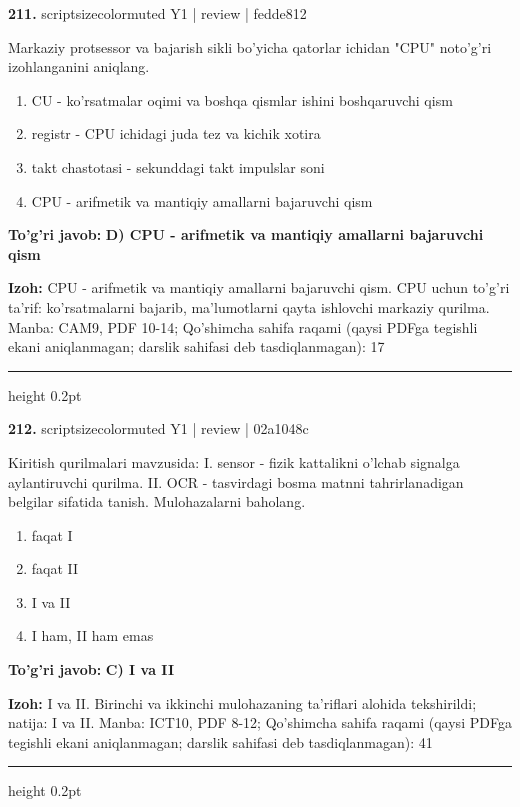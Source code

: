 \documentclass[10pt,a4paper]{article}
\begin{document}
{\bfseries\sffamily\color{ink} 211.} {scriptsizecolor{muted} Y1 | review | fedde812}
\par
Markaziy protsessor va bajarish sikli bo'yicha qatorlar ichidan "CPU" noto'g'ri izohlanganini aniqlang.
\begin{enumerate}[label=\Alph*),leftmargin=9mm]
\item CU - ko'rsatmalar oqimi va boshqa qismlar ishini boshqaruvchi qism
\item registr - CPU ichidagi juda tez va kichik xotira
\item takt chastotasi - sekunddagi takt impulslar soni
\item CPU - arifmetik va mantiqiy amallarni bajaruvchi qism
\end{enumerate}
\begin{tcolorbox}[enhanced,breakable,colback=teal!4,colframe=teal!60!black,boxrule=0.45pt,arc=1.2mm,left=2.7mm,right=2.7mm,top=1.8mm,bottom=1.8mm,before skip=2mm,after skip=2mm]
{\bfseries\sffamily\color{teal}To'g'ri javob:} \textbf{D) CPU - arifmetik va mantiqiy amallarni bajaruvchi qism}
\par\smallskip
{\bfseries Izoh:} CPU - arifmetik va mantiqiy amallarni bajaruvchi qism. CPU uchun to'g'ri ta'rif: ko'rsatmalarni bajarib, ma'lumotlarni qayta ishlovchi markaziy qurilma. Manba: CAM9, PDF 10-14; Qo'shimcha sahifa raqami (qaysi PDFga tegishli ekani aniqlanmagan; darslik sahifasi deb tasdiqlanmagan): 17
\end{tcolorbox}
\vspace{2mm}\hrule height 0.2pt\vspace{3mm}

{\bfseries\sffamily\color{ink} 212.} {scriptsizecolor{muted} Y1 | review | 02a1048c}
\par
Kiritish qurilmalari mavzusida: I. sensor - fizik kattalikni o'lchab signalga aylantiruvchi qurilma. II. OCR - tasvirdagi bosma matnni tahrirlanadigan belgilar sifatida tanish. Mulohazalarni baholang.
\begin{enumerate}[label=\Alph*),leftmargin=9mm]
\item faqat I
\item faqat II
\item I va II
\item I ham, II ham emas
\end{enumerate}
\begin{tcolorbox}[enhanced,breakable,colback=teal!4,colframe=teal!60!black,boxrule=0.45pt,arc=1.2mm,left=2.7mm,right=2.7mm,top=1.8mm,bottom=1.8mm,before skip=2mm,after skip=2mm]
{\bfseries\sffamily\color{teal}To'g'ri javob:} \textbf{C) I va II}
\par\smallskip
{\bfseries Izoh:} I va II. Birinchi va ikkinchi mulohazaning ta'riflari alohida tekshirildi; natija: I va II. Manba: ICT10, PDF 8-12; Qo'shimcha sahifa raqami (qaysi PDFga tegishli ekani aniqlanmagan; darslik sahifasi deb tasdiqlanmagan): 41
\end{tcolorbox}
\vspace{2mm}\hrule height 0.2pt\vspace{3mm}
\end{document}
